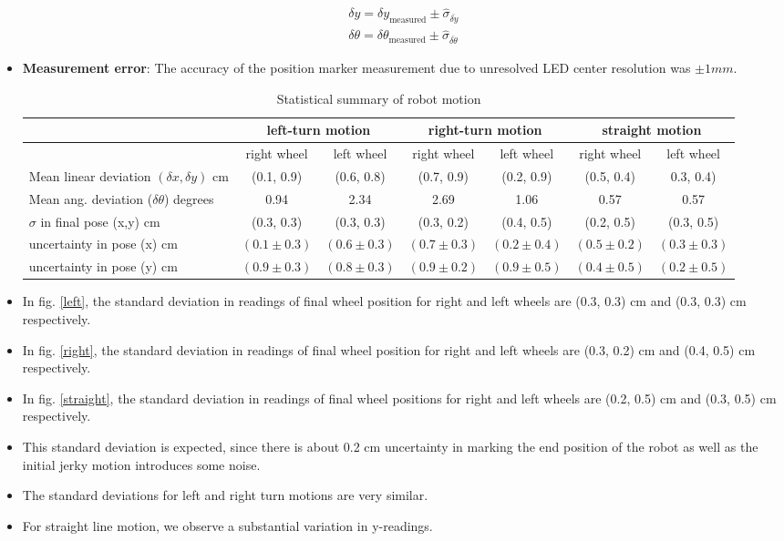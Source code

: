 \documentclass[11pt,a4paper,openright,twoside]{extreport}
\begin{document}
\begin{itemize}
\begin{align*}
\delta y = \delta y_{\text{measured}} \pm \hat{\sigma}_{\overline{\delta y}} \\
\delta \theta = \delta \theta_{\text{measured}} \pm \hat{\sigma}_{\overline{\delta \theta}}
\end{align*}
\item \textbf{Measurement error}: The accuracy of the position marker measurement due to unresolved LED center resolution was $\pm 1mm$.
\begin{table}[ht]
\centering
\begin{tabular}{| l | c | c | c | c | c | c |}
\hline
 & \multicolumn{2}{c|}{left-turn motion} & \multicolumn{2}{c|}{ right-turn motion} & \multicolumn{2}{c|}{straight motion} \\
\hline
 & right wheel & left wheel & right wheel & left wheel & right wheel & left wheel \\
\hline
Mean linear deviation $(\delta x, \delta y)$ cm & (0.1, 0.9) & (0.6, 0.8)
& (0.7, 0.9) & (0.2, 0.9) & (0.5, 0.4) & 0.3, 0.4) \\
\hline
Mean ang. deviation ($\delta \theta$) degrees & 0.94 & 2.34 & 2.69 & 1.06 & 0.57 & 0.57 \\
\hline
$\sigma$ in final pose (x,y) cm & (0.3, 0.3) & (0.3, 0.3) & (0.3, 0.2) & (0.4, 0.5) & (0.2, 0.5) & (0.3, 0.5)\\
\hline
uncertainty in pose (x) cm & $(0.1 \pm 0.3)$ & $(0.6 \pm 0.3)$ & $(0.7 \pm 0.3)$ & $(0.2 \pm 0.4)$ & $(0.5 \pm 0.2)$ & $(0.3 \pm 0.3)$ \\
uncertainty in pose (y) cm & $(0.9 \pm 0.3)$ & $(0.8 \pm 0.3)$ & $(0.9 \pm 0.2)$ & $(0.9 \pm 0.5)$ & $(0.4 \pm 0.5)$ & $(0.2 \pm 0.5)$ \\
\hline
\end{tabular}
\caption{Statistical summary of robot motion}
\label{stats}
\end{table}

\item In fig. \ref{left}, the standard deviation in readings of final wheel position for right and left wheels are (0.3, 0.3) cm and (0.3, 0.3) cm respectively.
\item In fig. \ref{right}, the standard deviation in readings of final wheel position for right and left wheels are (0.3, 0.2) cm and (0.4, 0.5) cm respectively.
\item In fig. \ref{straight}, the standard deviation in readings of final wheel positions for right and left wheels are (0.2, 0.5) cm and (0.3, 0.5) cm respectively.
\item This standard deviation is expected, since there is about 0.2 cm uncertainty in marking the end position of the robot as well as the initial jerky motion introduces some noise.
\item The standard deviations for left and right turn motions are very similar.
\item For straight line motion, we observe a substantial variation in y-readings.
\end{itemize}

\end{document}
